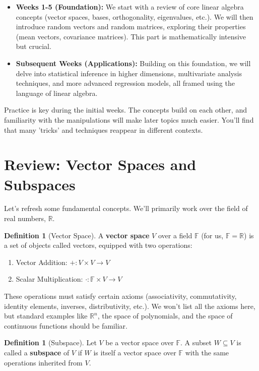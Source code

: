 \documentclass[11pt]{article}
\theoremstyle{definition}
\newtheorem{definition}[theorem]{Definition}
\theoremstyle{remark}
\newcommand{\R}{\mathbb{R}}
\newcommand{\F}{\mathbb{F}}
\begin{document}
\begin{itemize}
    \item \textbf{Weeks 1-5 (Foundation):} We start with a review of core linear algebra concepts (vector spaces, bases, orthogonality, eigenvalues, etc.). We will then introduce random vectors and random matrices, exploring their properties (mean vectors, covariance matrices). This part is mathematically intensive but crucial.
    \item \textbf{Subsequent Weeks (Applications):} Building on this foundation, we will delve into statistical inference in higher dimensions, multivariate analysis techniques, and more advanced regression models, all framed using the language of linear algebra.
\end{itemize}
Practice is key during the initial weeks. The concepts build on each other, and familiarity with the manipulations will make later topics much easier. You'll find that many 'tricks' and techniques reappear in different contexts.

\section{Review: Vector Spaces and Subspaces}

Let's refresh some fundamental concepts. We'll primarily work over the field of real numbers, $\R$.

\begin{definition}[Vector Space]
A \textbf{vector space} $V$ over a field $\F$ (for us, $\F = \R$) is a set of objects called vectors, equipped with two operations:
\begin{enumerate}
    \item Vector Addition: $+ : V \times V \to V$
    \item Scalar Multiplication: $\cdot : \F \times V \to V$
\end{enumerate}
These operations must satisfy certain axioms (associativity, commutativity, identity elements, inverses, distributivity, etc.). We won't list all the axioms here, but standard examples like $\R^n$, the space of polynomials, and the space of continuous functions should be familiar.
\end{definition}

\begin{definition}[Subspace]
Let $V$ be a vector space over $\F$. A subset $W \subseteq V$ is called a \textbf{subspace} of $V$ if $W$ is itself a vector space over $\F$ with the same operations inherited from $V$.
\end{definition}
\end{document}
